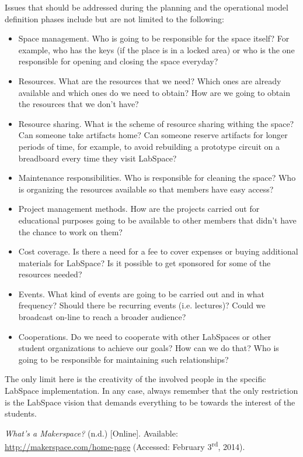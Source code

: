 \documentclass[a4paper, 11pt]{article}
\begin{document}
Issues that should be addressed during the planning and the operational model definition phases include but are not limited to the following:

\begin{itemize}[noitemsep]
    \item Space management. Who is going to be responsible for the space itself? For example, who has the keys (if the place is in a locked area) or who is the one responsible for opening and closing the space everyday?
    \item Resources. What are the resources that we need? Which ones are already available and which ones do we need to obtain? How are we going to obtain the resources that we don't have? 
    \item Resource sharing. What is the scheme of resource sharing withing the space? Can someone take artifacts home? Can someone reserve artifacts for longer periods of time, for example, to avoid rebuilding a prototype circuit on a breadboard every time they visit LabSpace?
    \item Maintenance responsibilities. Who is responsible for cleaning the space? Who is organizing the resources available so that members have easy access?
    \item Project management methods. How are the projects carried out for educational purposes going to be available to other members that didn't have the chance to work on them?
    \item Cost coverage. Is there a need for a fee to cover expenses or buying additional materials for LabSpace? Is it possible to get sponsored for some of the resources needed?
    \item Events. What kind of events are going to be carried out and in what frequency? Should there be recurring events (i.e. lectures)? Could we broadcast on-line to reach a broader audience?
    \item Cooperations. Do we need to cooperate with other LabSpaces or other student organizations to achieve our goals? How can we do that? Who is going to be responsible for maintaining such relationships?
\end{itemize}

The only limit here is the creativity of the involved people in the specific LabSpace implementation. In any case, always remember that the only restriction is the LabSpace vision that demands everything to be towards the interest of the students.

\newpage

\begin{thebibliography}{9}
     \emph{What’s a Makerspace?} (n.d.) [Online]. Available: \\ \href{http://makerspace.com/home-page}{http://makerspace.com/home-page} (Accessed: February 3\textsuperscript{rd}, 2014).
\end{thebibliography}
\end{document}
